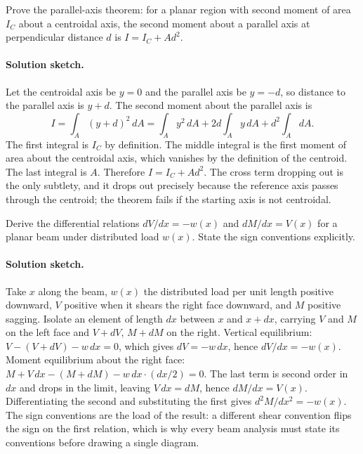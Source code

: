 \begin{exercise}
Prove the parallel-axis theorem: for a planar region with second
moment of area $I_C$ about a centroidal axis, the second moment
about a parallel axis at perpendicular distance $d$ is $I = I_C + A
d^2$.

\paragraph{Solution sketch.} Let the centroidal axis be $y = 0$ and the
parallel axis be $y = -d$, so distance to the parallel axis is $y + d$.
The second moment about the parallel axis is
\[
I = \int_A (y + d)^2\, dA
= \int_A y^2\, dA + 2d \int_A y\, dA + d^2 \int_A dA.
\]
The first integral is $I_C$ by definition. The middle integral is the
first moment of area about the centroidal axis, which vanishes by the
definition of the centroid. The last integral is $A$. Therefore
$I = I_C + A d^2$. The cross term dropping out is the only subtlety, and
it drops out precisely because the reference axis passes through the
centroid; the theorem fails if the starting axis is not centroidal.
\end{exercise}

\begin{exercise}
Derive the differential relations $dV/dx = -w(x)$ and $dM/dx = V(x)$
for a planar beam under distributed load $w(x)$. State the sign
conventions explicitly.

\paragraph{Solution sketch.} Take $x$ along the beam, $w(x)$ the
distributed load per unit length positive downward, $V$ positive when it
shears the right face downward, and $M$ positive sagging. Isolate an
element of length $dx$ between $x$ and $x + dx$, carrying $V$ and $M$ on
the left face and $V + dV$, $M + dM$ on the right. Vertical equilibrium:
$V - (V + dV) - w\, dx = 0$, which gives $dV = -w\, dx$, hence
$dV/dx = -w(x)$. Moment equilibrium about the right face:
$M + V\, dx - (M + dM) - w\, dx \cdot (dx/2) = 0$. The last term is
second order in $dx$ and drops in the limit, leaving $V\, dx = dM$, hence
$dM/dx = V(x)$. Differentiating the second and substituting the first
gives $d^2M/dx^2 = -w(x)$. The sign conventions are the load of the
result: a different shear convention flips the sign on the first
relation, which is why every beam analysis must state its conventions
before drawing a single diagram.
\end{exercise}

